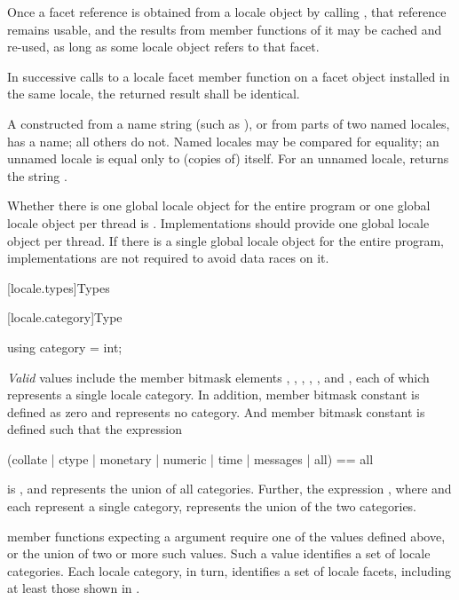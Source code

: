 \pnum
Once a facet reference is obtained from a locale object by calling
,
that reference remains usable, and the results from member functions
of it may be cached and re-used, as long as some locale object refers
to that facet.

\pnum
In successive calls to a locale facet member function on a facet object
installed in the same locale, the returned result shall be identical.

\pnum
A
constructed from a name string (such as ), or from parts of
two named locales, has a name; all others do not.
Named locales may be compared for equality; an unnamed locale is equal
only to (copies of) itself.
For an unnamed locale,
returns the string
.

\pnum
Whether there is one global locale object for the entire program or one global locale
object per thread is .
Implementations should provide one global locale object per
thread. If there is a single global locale object for the entire program,
implementations are not required to avoid data races on it.

[locale.types]{Types}


[locale.category]{Type }

%
\begin{itemdecl}
using category = int;
\end{itemdecl}

\pnum
\textit{Valid}
values include the
member bitmask elements
,
,
,
,
,
and
,
each of which represents a single locale category.
In addition,
member bitmask constant
is defined as zero and represents no category. And
member bitmask constant
is defined such that the expression
\begin{codeblock}
(collate | ctype | monetary | numeric | time | messages | all) == all
\end{codeblock}
is
,
and represents the union of all categories.
Further, the expression
,
where
and
each represent a single category, represents the union of the two categories.

\pnum
{}
member functions expecting a
argument require one of the
values defined above, or the union of two or more such values.
Such a
value identifies a set of locale categories.
Each locale category,
in turn, identifies a set of locale facets, including at least those
shown in .

